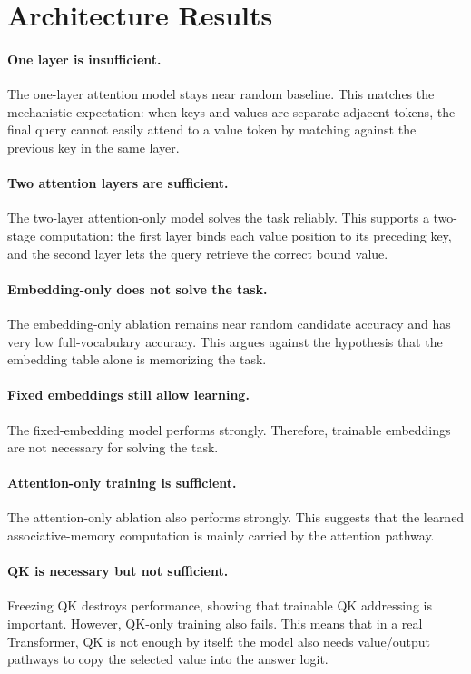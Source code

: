 \documentclass[11pt]{article}
\begin{document}
\section{Architecture Results}

\paragraph{One layer is insufficient.}
The one-layer attention model stays near random baseline.
This matches the mechanistic expectation: when keys and values are separate adjacent tokens, the final query cannot easily attend to a value token by matching against the previous key in the same layer.

\paragraph{Two attention layers are sufficient.}
The two-layer attention-only model solves the task reliably.
This supports a two-stage computation:
the first layer binds each value position to its preceding key, and the second layer lets the query retrieve the correct bound value.

\paragraph{Embedding-only does not solve the task.}
The embedding-only ablation remains near random candidate accuracy and has very low full-vocabulary accuracy.
This argues against the hypothesis that the embedding table alone is memorizing the task.

\paragraph{Fixed embeddings still allow learning.}
The fixed-embedding model performs strongly.
Therefore, trainable embeddings are not necessary for solving the task.

\paragraph{Attention-only training is sufficient.}
The attention-only ablation also performs strongly.
This suggests that the learned associative-memory computation is mainly carried by the attention pathway.

\paragraph{QK is necessary but not sufficient.}
Freezing QK destroys performance, showing that trainable QK addressing is important.
However, QK-only training also fails.
This means that in a real Transformer, QK is not enough by itself: the model also needs value/output pathways to copy the selected value into the answer logit.
\end{document}
